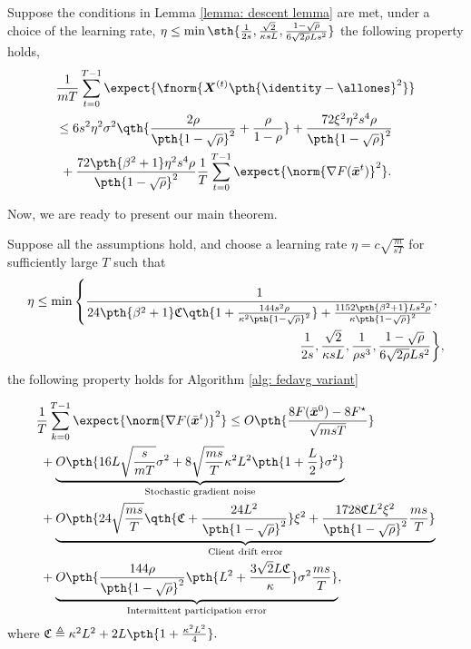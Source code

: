 \documentclass[letterpaper, 10 pt, conference]{ieeeconf}  %
\newcommand{\x}{{\bm x}}
\begin{document}
\begin{lemma}
\label{lemma: consensus}
Suppose the conditions in Lemma \ref{lemma: descent lemma} are met,
under a choice of the learning rate,
$\eta \le \min\sth{\frac{1}{2s}, \frac{\sqrt{2}}{\kappa sL},\frac{1-\sqrt{\rho}}{6\sqrt{2\rho}Ls^2}}$
the following property holds,
\begin{align*}
&\frac{1}{mT}\sum_{t=0}^{T-1}\expect{\fnorm{\bm{X}^{(t)} \pth{\identity - \allones}^2}}\\
& \le 6 s^2 \eta^2 \sigma^2 \qth{\frac{2\rho }{\pth{1-\sqrt{\rho}}^2}
+ {\frac{\rho }{1-\rho} }}+\frac{72 \xi^2 \eta^2 s^4 \rho}{\pth{1-\sqrt{\rho}}^2}\\
&~ +\frac{72 \pth{\beta^2 + 1} \eta^2 s^4 \rho}{\pth{1-\sqrt{\rho}}^2}\frac{1}{T}\sum_{t=0}^{T-1}\expect{\norm{\nabla F(\bar{\x}^t)}^2}.
\end{align*}
\end{lemma}
Now, we are ready to present our main theorem.
\begin{theorem}
\label{thm: main}
Suppose all the assumptions hold,
and choose a learning rate $\eta = c \sqrt{\frac{m}{sT}}$ for sufficiently large $T$ such that %
\begin{align*}
\eta \le \min \left\{\frac{1}{24\pth{\beta^2 + 1}\mathfrak{C} \qth{1 + \frac{144 s^2 \rho}{\kappa^2 \pth{1-\sqrt{\rho}}^2}}+\frac{1152 \pth{\beta^2 + 1} L s^2 \rho}{\kappa\pth{1-\sqrt{\rho}}^2}},\right.&\\
\left.\frac{1}{2s}, 
\frac{\sqrt{2}}{\kappa sL},\frac{1}{\rho s^3},
\frac{1-\sqrt{\rho}}{6\sqrt{2\rho}Ls^2}\right\}&,
\end{align*}
the following property holds for Algorithm \ref{alg: fedavg variant}

\begin{align*}
&\frac{1}{T}\sum_{k=0}^{T-1}\expect{\norm{\nabla F(\bar{\x}^t)}^2} 
\le O \pth{\frac{8F(\bar{\x}^0) - 8 F^\star }{\sqrt{msT}} }\\
&~+\underbrace{O \pth{  16 L \sqrt{\frac{s}{mT}} \sigma^2
 +
 8 \sqrt{\frac{ms}{T}} \kappa^2 L^2
\pth{1 + \frac{L}{2}} 
 \sigma^2
 }}_{\text{Stochastic gradient noise}}\\ 
&~+\underbrace{O \pth{ 24 \sqrt{\frac{ms}{T}} \qth{
\mathfrak{C}
+ \frac{24 L^2}{\pth{1-\sqrt{\rho}}^2}
} \xi^2 
+\frac{1728 \mathfrak{C} L^2 \xi^2 }{\pth{1-\sqrt{\rho}}^2} \frac{ms}{T}}
}_{\text{Client drift error}}\\
&~+ \underbrace{O \pth{\frac{144  \rho  }{\pth{1-\sqrt{\rho}}^2}   \pth{ L^2 + \frac{3\sqrt{2} L \mathfrak{C}}{\kappa}}\sigma^2 \frac{ms}{T}}}_{\text{Intermittent participation error}},\\
\end{align*}
where
$\mathfrak{C} \triangleq \kappa^2 L^2 + 2 L \pth{1 + \frac{\kappa^2 L^2}{4}}.$
\end{theorem}
\end{document}
